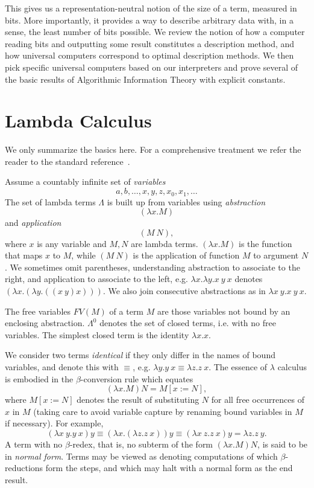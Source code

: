 \documentclass{article}
\begin{document}
This gives us a representation-neutral notion of the size of a term,
measured in bits.
More importantly, it provides a way to describe arbitrary
data with, in a sense, the least number of bits possible.
We review the notion of how a computer reading bits and outputting
some result constitutes a description method, and how universal computers
correspond to optimal description methods.
We then pick specific universal computers based on our interpreters
and prove several of the basic results of Algorithmic Information Theory
with explicit constants.

\section{Lambda Calculus}
We only summarize the basics here. For a comprehensive treatment
we refer the reader to the standard reference~\cite{b}.

Assume a countably infinite set of {\em variables}
\[a,b,\ldots,x,y,z,x_0,x_1,\ldots\]
The set of lambda terms $\Lambda$ is built up from variables
using {\em abstraction} \[ (\lambda x.M) \]
and {\em application} \[ (M\ N), \]
where $x$ is any variable and $M,N$ are lambda terms.
$(\lambda x.M)$ is the function that maps $x$ to $M$,
while $(M\ N)$ is the application of function $M$ to argument $N$.
We sometimes omit parentheses, understanding abstraction to associate to
the right, and application to associate to the left, e.g.
$\lambda x.\lambda y.x\ y\ x$ denotes $(\lambda x.(\lambda y.((x\ y)x)))$.
We also join consecutive abstractions as in $\lambda x\ y.x\ y\ x$.

The free variables $FV(M)$ of a term $M$ are those variables not bound
by an enclosing abstraction. $\Lambda^0$ denotes the set of closed terms,
i.e. with no free variables. The simplest closed term is the identity
$\lambda x.x$.

We consider two terms {\em identical} if they only differ in the names
of bound variables, and denote this with $\equiv$, e.g.
$\lambda y.y\ x \equiv \lambda z.z\ x$.
The essence of $\lambda$ calculus is embodied in
the $\beta$-conversion rule which equates
\[(\lambda x.M)N = M[x:=N],\] where $M[x:=N]$ denotes the result
of substituting $N$ for all free occurrences of $x$ in $M$ (taking care
to avoid variable capture by renaming bound variables in $M$ if necessary).
For example,
\[(\lambda x\ y.y\ x)y \equiv (\lambda x.(\lambda z.z\ x))y
\equiv (\lambda x\ z.z\ x)y = \lambda z.z\ y.\]
A term with no $\beta$-redex, that is, no subterm of the form $(\lambda x.M)N$,
is said to be in {\em normal form}. Terms may be viewed as
denoting computations of which $\beta$-reductions form the steps,
and which may halt with a normal form as the end result.
\end{document}
